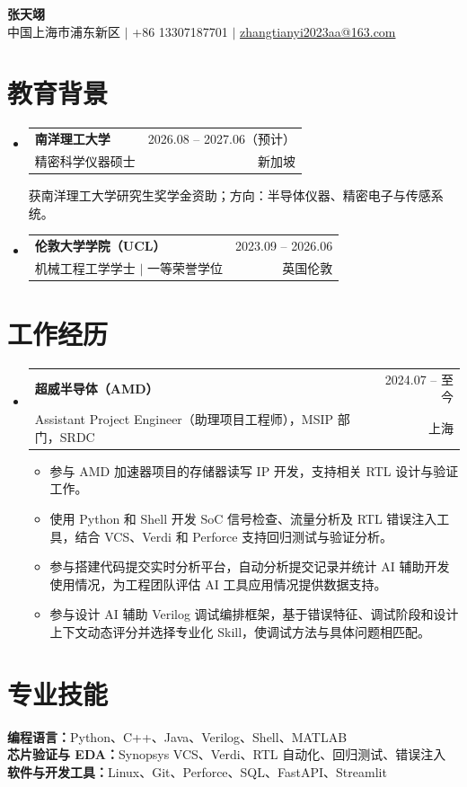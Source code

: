 ﻿\documentclass[a4paper,11pt]{article}
\makeatletter
\newcommand{\CVItem}[1]{\item\small #1}
\newcommand{\CVSubheading}[4]{%
  \item\begin{tabularx}{\textwidth}{@{}>{\raggedright\arraybackslash}X@{\hspace{1em}}r@{}}
    \textbf{#1} & #2 \\
    \small #3 & \small #4
  \end{tabularx}\vspace{-3pt}}
\newcommand{\CVSubHeadingListStart}{\begin{itemize}[leftmargin=0pt,label={},itemsep=4pt,topsep=0pt,parsep=0pt,partopsep=0pt]}
\newcommand{\CVSubHeadingListEnd}{\end{itemize}}
\newcommand{\CVItemListStart}{\begin{itemize}[leftmargin=0.4cm,label=\textbullet,itemsep=1pt,topsep=2pt,parsep=0pt,partopsep=0pt]}
\newcommand{\CVItemListEnd}{\end{itemize}}
\makeatother
\begin{document}
\begin{center}
  {\LARGE\textbf{张天翊}}\\[2pt]
  \small 中国上海市浦东新区 $|$ +86 13307187701 $|$
  \href{mailto:zhangtianyi2023aa@163.com}{zhangtianyi2023aa@163.com}
\end{center}
\vspace{-9pt}
\section{教育背景}
\CVSubHeadingListStart
  \CVSubheading{南洋理工大学}{2026.08 -- 2027.06（预计）}
    {精密科学仪器硕士}{新加坡}
  {\small 获南洋理工大学研究生奖学金资助；方向：半导体仪器、精密电子与传感系统。\par}
  \CVSubheading{伦敦大学学院（UCL）}{2023.09 -- 2026.06}
    {机械工程工学学士 $|$ 一等荣誉学位}{英国伦敦}
\CVSubHeadingListEnd
\section{工作经历}
\CVSubHeadingListStart
  \CVSubheading{超威半导体（AMD）}{2024.07 -- 至今}
    {Assistant Project Engineer（助理项目工程师），MSIP 部门，SRDC}{上海}
  \CVItemListStart
    \CVItem{参与 AMD 加速器项目的存储器读写 IP 开发，支持相关 RTL 设计与验证工作。}
    \CVItem{使用 Python 和 Shell 开发 SoC 信号检查、流量分析及 RTL 错误注入工具，结合 VCS、Verdi 和 Perforce 支持回归测试与验证分析。}
    \CVItem{参与搭建代码提交实时分析平台，自动分析提交记录并统计 AI 辅助开发使用情况，为工程团队评估 AI 工具应用情况提供数据支持。}
    \CVItem{参与设计 AI 辅助 Verilog 调试编排框架，基于错误特征、调试阶段和设计上下文动态评分并选择专业化 Skill，使调试方法与具体问题相匹配。}
  \CVItemListEnd
\CVSubHeadingListEnd
\section{专业技能}
{\small
\textbf{编程语言：}Python、C++、Java、Verilog、Shell、MATLAB\\
\textbf{芯片验证与 EDA：}Synopsys VCS、Verdi、RTL 自动化、回归测试、错误注入\\
\textbf{软件与开发工具：}Linux、Git、Perforce、SQL、FastAPI、Streamlit\par}
\end{document}
